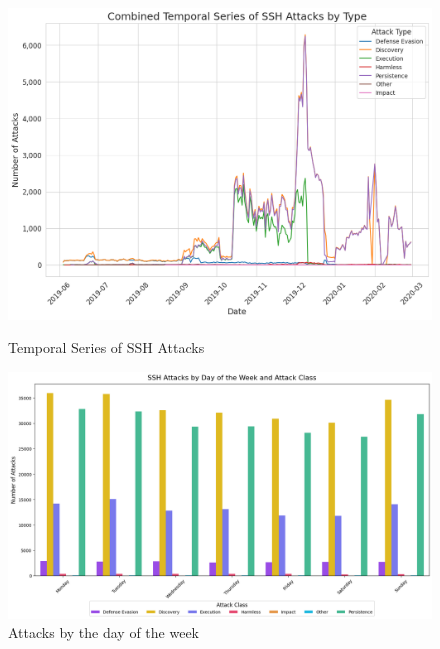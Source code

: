         \begin{figure}[h]
            \centering
            \begin{minipage}[c]{0.47\textwidth}
                \centering
                \includegraphics[width=\textwidth]{../figures/plots/section1/combined_temporal_series_of_ssh_attacks_by_type.png}
                \caption{Temporal Series of SSH Attacks}
                \label{fig:temporal-analysis}
            \end{minipage}
            \hfill
            \begin{minipage}[c]{0.47\textwidth}
                \centering
                \includegraphics[width=\textwidth]{../figures/plots/section1/ssh_attacks_by_day_of_the_week_and_attack_class.png}
                \caption{Attacks by the day of the week}
                \label{fig:attacks-day-of-the-week}
            \end{minipage}
        \end{figure}

